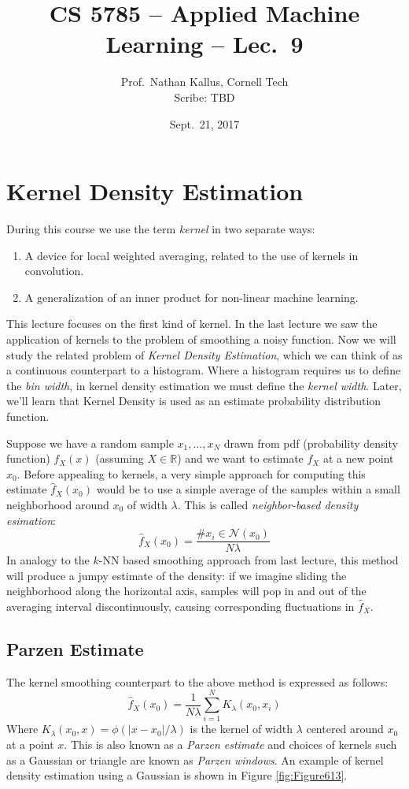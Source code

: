 \documentclass[a4paper]{article}
\title{CS 5785 -- Applied Machine Learning -- Lec.\ 9}
\author{Prof.\ Nathan Kallus, Cornell Tech\\Scribe: TBD}
\date{Sept.\ 21, 2017}
\begin{document}
\maketitle

\section{Kernel Density Estimation}

During this course we use the term \textit{kernel} in two separate ways:
\begin{enumerate}
\item A device for local weighted averaging, related to the use of kernels in convolution.
\item A generalization of an inner product for non-linear machine learning.
\end{enumerate}
This lecture focuses on the first kind of kernel.  In the last lecture we saw the application of kernels to the problem of smoothing a noisy function.  Now we will study the related problem of \emph{Kernel Density Estimation}, which we can think of as a continuous counterpart to a histogram.  Where a histogram requires us to define the \emph{bin width}, in kernel density estimation we must define the \emph{kernel width}. Later, we'll learn that Kernel Density is used as an estimate probability distribution function.


Suppose we have a random sample $x_1, \ldots, x_N$ drawn from pdf (probability density function) $f_X(x)$ (assuming $X\in \mathbb{R}$) and we want to estimate $f_X$ at a new point $x_0$. Before appealing to kernels, a very simple approach for computing this estimate $\hat{f}_X(x_0)$ would be to use a simple average of the samples within a small neighborhood around $x_0$ of width $\lambda$. This is called \textit{neighbor-based density esimation}:
$$\hat{f}_X(x_0)=\frac{\#x_i \in \mathcal{N}(x_0)}{N\lambda}$$
In analogy to the $k$-NN based smoothing approach from last lecture, this method will produce a jumpy estimate of the density: if we imagine sliding the neighborhood along the horizontal axis, samples will pop in and out of the averaging interval discontinuously, causing corresponding fluctuations in $\hat{f}_X$.


\subsection{Parzen Estimate}
The kernel smoothing counterpart to the above method is expressed as follows:
$$\hat{f}_X(x_0)=\frac{1}{N\lambda}\sum_{i=1}^N K_\lambda(x_0, x_i)$$
Where $K_\lambda(x_0, x)=\phi(|x-x_0|/\lambda)$ is the kernel of width $\lambda$ centered around $x_0$ at a point $x$. This is also known as a \emph{Parzen estimate} and choices of kernels such as a Gaussian or triangle are known as \emph{Parzen windows}.  An example of kernel density estimation using a Gaussian is shown in Figure \ref{fig:Figure613}.
\end{document}
